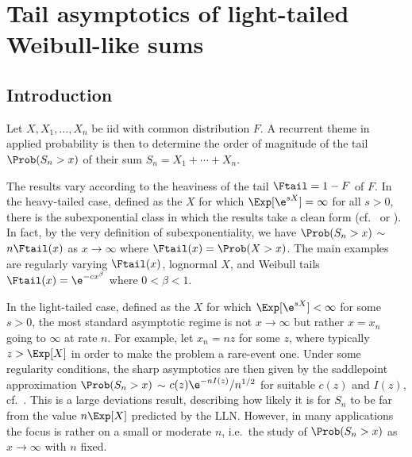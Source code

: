 \chapter{Tail asymptotics of light-tailed Weibull-like sums} \label{chp:weibull}

\section{Introduction}\label{S:Intr}

Let $X,X_1,\ldots,X_n$ be iid with common distribution $F$. A recurrent theme in applied probability is then
to determine the order of magnitude of the tail $\Prob(S_n>x)$ of their sum $S_n=X_1+\cdots+X_n$.

The results vary according to the heaviness  of the tail $\Ftail=1-F$ of $F$. In the heavy-tailed case, defined as the $X$ for which $\Exp[\e^{sX}]=\infty$ for all $s>0$, there is the subexponential class in which the results take a clean form (cf.\ \cite{embrechts2013modelling} or \cite{asmussen2010ruin}). In fact, by the
very definition of subexponentiality, we have $\Prob(S_n>x)$ $\sim$ $n\Ftail(x)$ as $x\to\infty$ where $\Ftail(x)=\Prob(X>x)$. The main examples are regularly varying $\Ftail(x)$, lognormal $X$, and Weibull tails $\Ftail(x)=\e^{-cx^\beta}$ where $0<\beta<1$.

In the light-tailed case, defined as the $X$ for which $\Exp[\e^{sX}]<\infty$ for some $s>0$, the most standard asymptotic regime is not $x\to\infty$ but rather
$x=x_n$ going to $\infty$ at rate $n$. For example, let $x_n=nz$ for some $z$, where typically $z>\Exp[X]$ in order to make the problem a rare-event one.
Under some regularity conditions, the sharp asymptotics are then given by the saddlepoint approximation $\Prob(S_n>x)$ $\sim$
$c(z)\e^{-nI(z)}/n^{1/2}$ for suitable $c(z)$ and $I(z)$, cf.\ \cite{jensen1995saddlepoint}. This is a large deviations result, describing how likely
it is for $S_n$ to be far from the value $n\Exp[X]$ predicted by the LLN. However, in many applications the focus is rather on a small
or moderate $n$, i.e.\ the study of  $\Prob(S_n>x)$ as $x\to\infty$ with $n$ fixed.

